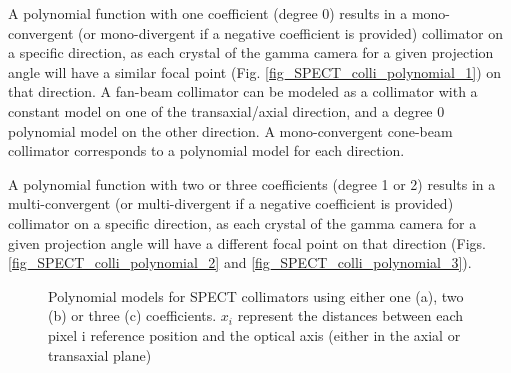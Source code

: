 \documentclass[a4paper, 11pt]{article}
\begin{document}
A polynomial function with one coefficient (degree 0) results in a mono-convergent (or mono-divergent if a negative coefficient is provided)
collimator on a specific direction, as each crystal of the gamma camera for a given projection angle will have a similar focal point (Fig.
\ref{fig_SPECT_colli_polynomial_1}) on that direction. A fan-beam collimator can be modeled as a collimator with a constant model on one of
the transaxial/axial direction, and a degree 0 polynomial model on the other direction. A mono-convergent cone-beam collimator corresponds
to a polynomial model for each direction.

A polynomial function with two or three coefficients (degree 1 or 2) results in a multi-convergent (or multi-divergent if a negative coefficient
is provided) collimator on a specific direction, as each crystal of the gamma camera for a given projection angle will have a different focal
point on that direction (Figs. \ref{fig_SPECT_colli_polynomial_2} and \ref{fig_SPECT_colli_polynomial_3}).


\begin{figure} [h]
  \centerline
  {
  }
  \caption{Polynomial models for SPECT collimators using either one (a), two (b) or three (c) coefficients. $x_i$ represent the distances between each pixel i reference position and the optical axis (either in the axial or transaxial plane)}
  \label{fig_SPECT_colli_polynomial}
\end{figure}
\end{document}
